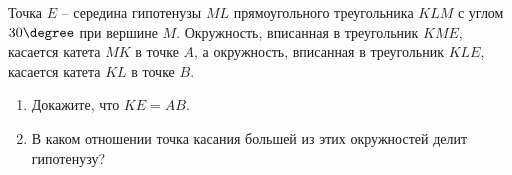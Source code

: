 \begin{ex}
	\begin{condition}
		Точка \( E \) – середина гипотенузы \( ML  \) прямоугольного треугольника \( KLM  \) с углом \( 30\degree \) при вершине \( M \). Окружность, вписанная в треугольник \( KME \), касается катета \( MK  \) в точке \( A \), а окружность, вписанная в треугольник \( KLE \), касается катета \( KL  \) в точке \( B \).
		\begin{enumerate}
			\item Докажите, что \( KE = AB \).
			\item В каком отношении точка касания большей из этих окружностей делит гипотенузу?
		\end{enumerate} 
	\end{condition}
\end{ex}